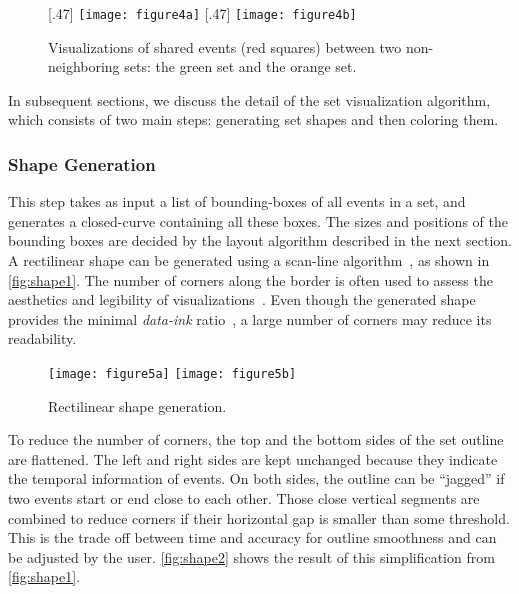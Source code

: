 \begin{figure}
	\centering
	[.47\columnwidth]
	{\texttt{[image: figure4a]}}
	\hfill
	[.47\columnwidth]
	{\texttt{[image: figure4b]}}
	\caption[Visualizations of shared events]{Visualizations of shared events (red squares) between two non-neighboring sets: the green set and the orange set.}
	\label{fig:layering-compare}
\end{figure}

In subsequent sections, we discuss the detail of the set visualization algorithm, which consists of two main steps: generating set shapes and then coloring them.

\subsubsection{Shape Generation}
\label{sub:shapesgeneration}
This step takes as input a list of bounding-boxes of all events in a set, and generates a closed-curve containing all these boxes. The sizes and positions of the bounding boxes are decided by the layout algorithm described in the next section. A rectilinear shape can be generated using a scan-line algorithm~\cite{Foley1997}, as shown in \autoref{fig:shape1}. The number of corners along the border is often used to assess the aesthetics and legibility of visualizations~\cite{Tanahashi2012}. Even though the generated shape provides the minimal \textit{data-ink} ratio~\cite{Tufte1983}, a large number of corners may reduce its readability.

\begin{figure}
	\centering
	{\texttt{[image: figure5a]}}
	\hfill
	{\texttt{[image: figure5b]}}
	\caption{Rectilinear shape generation.}
	\label{fig:shape}
\end{figure}

To reduce the number of corners, the top and the bottom sides of the set outline are flattened. The left and right sides  are kept unchanged because they indicate the temporal information of events. On both sides, the outline can be ``jagged'' if two events start or end close to each other. Those close vertical segments are combined to reduce corners if their horizontal gap is smaller than some threshold. This is the trade off between time and accuracy for outline smoothness and can be adjusted by the user. \autoref{fig:shape2} shows the result of this simplification from \autoref{fig:shape1}.

